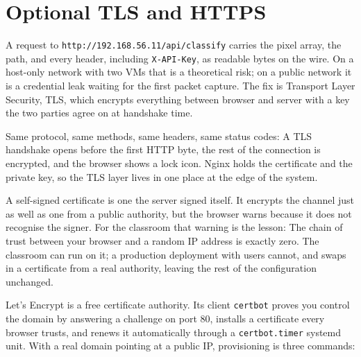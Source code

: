 \section{Optional TLS and HTTPS}

A request to \texttt{http://192.168.56.11/api/classify} carries the
pixel array, the path, and every header, including \texttt{X-API-Key},
as readable bytes on the wire.
On a host-only network with two VMs that is a theoretical risk; on a
public network it is a credential leak waiting for the first packet
capture.
The fix is Transport Layer Security, TLS, which encrypts everything
between browser and server with a key the two parties agree on at
handshake time.

Same protocol, same methods, same headers, same status codes: A TLS
handshake opens before the first HTTP byte, the rest of the connection
is encrypted, and the browser shows a lock icon.
Nginx holds the certificate and the private key, so the TLS layer lives
in one place at the edge of the system.


A self-signed certificate is one the server signed itself.
It encrypts the channel just as well as one from a public authority, but
the browser warns because it does not recognise the signer.
For the classroom that warning is the lesson: The chain of trust between
your browser and a random IP address is exactly zero.
The classroom can run on it; a production deployment with users cannot,
and swaps in a certificate from a real authority, leaving the rest of
the configuration unchanged.

Let's Encrypt is a free certificate authority.
Its client \texttt{certbot} proves you control the domain
by answering a challenge on port 80, installs a certificate every browser
trusts, and renews it automatically through a \texttt{certbot.timer}
systemd unit.
With a real domain pointing at a public IP, provisioning is three
commands:

